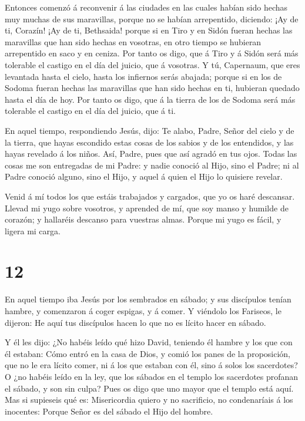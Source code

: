  Entonces comenzó á reconvenir á las ciudades en las cuales
habían sido hechas muy muchas de sus maravillas, porque no se habían
arrepentido, diciendo:  ¡Ay de ti, Corazín! ¡Ay de ti,
Bethsaida! porque si en Tiro y en Sidón fueran hechas las maravillas que
han sido hechas en vosotras, en otro tiempo se hubieran arrepentido en
saco y en ceniza.  Por tanto os digo, que á Tiro y á Sidón
será más tolerable el castigo en el día del juicio, que á vosotras.
 Y tú, Capernaum, que eres levantada hasta el cielo, hasta
los infiernos serás abajada; porque si en los de Sodoma fueran hechas
las maravillas que han sido hechas en ti, hubieran quedado hasta el día
de hoy.  Por tanto os digo, que á la tierra de los de
Sodoma será más tolerable el castigo en el día del juicio, que á ti.

 En aquel tiempo, respondiendo Jesús, dijo: Te alabo,
Padre, Señor del cielo y de la tierra, que hayas escondido estas cosas
de los sabios y de los entendidos, y las hayas revelado á los niños.
 Así, Padre, pues que así agradó en tus ojos. 
Todas las cosas me son entregadas de mi Padre: y nadie conoció al Hijo,
sino el Padre; ni al Padre conoció alguno, sino el Hijo, y aquel á quien
el Hijo lo quisiere revelar.

 Venid á mí todos los que estáis trabajados y cargados, que
yo os haré descansar.  Llevad mi yugo sobre vosotros, y
aprended de mí, que soy manso y humilde de corazón; y hallaréis descanso
para vuestras almas.  Porque mi yugo es fácil, y ligera mi
carga.

\hypertarget{section-11}{%
\section{12}\label{section-11}}

 En aquel tiempo iba Jesús por los sembrados en sábado; y
sus discípulos tenían hambre, y comenzaron á coger espigas, y á comer.
 Y viéndolo los Fariseos, le dijeron: He aquí tus discípulos
hacen lo que no es lícito hacer en sábado.

 Y él les dijo: ¿No habéis leído qué hizo David, teniendo él
hambre y los que con él estaban:  Cómo entró en la casa de
Dios, y comió los panes de la proposición, que no le era lícito comer,
ni á los que estaban con él, sino á solos los sacerdotes?  O
¿no habéis leído en la ley, que los sábados en el templo los sacerdotes
profanan el sábado, y son sin culpa?  Pues os digo que uno
mayor que el templo está aquí.  Mas si supieseis qué es:
Misericordia quiero y no sacrificio, no condenaríais á los inocentes:
 Porque Señor es del sábado el Hijo del hombre.

